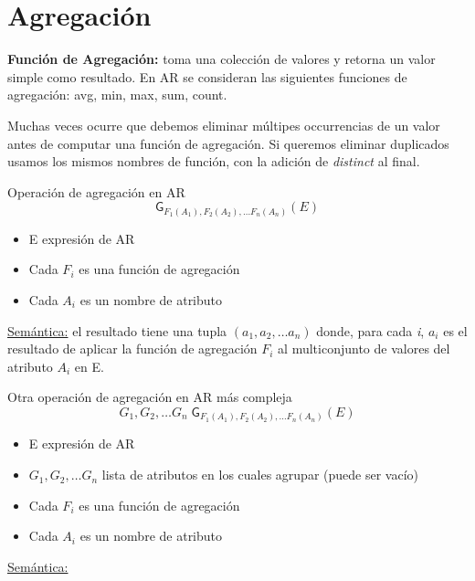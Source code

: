 \documentclass[12pt,a4paper]{report}
\begin{document}
	\section{Agregación}
		\par \textbf{Función de Agregación:} toma una colección de valores y retorna un valor simple como resultado. En AR se consideran las siguientes funciones de agregación: avg, min, max, sum, count.
		\par Muchas veces ocurre que debemos eliminar múltipes occurrencias de un valor antes de computar una función de agregación. Si queremos eliminar duplicados usamos los mismos nombres de función, con la adición de \textit{distinct} al final.
		\vspace{5mm}		
		\par Operación de agregación en AR
		\[\mathsf{G}_{F_{1}(A_{1}), F_{2}(A_{2}), \dotsc F_{n}(A_{n})}(E)\]
		\begin{itemize}
			\item E expresión de AR
			\item Cada $F_{i}$ es una función de agregación
			\item Cada $A_{i}$ es un nombre de atributo
		\end{itemize}
		\par \underline{Semántica:} el resultado tiene una tupla $(a_{1}, a_{2}, \dotsc a_{n})$ donde, para cada \textit{i}, $a_{i}$ es el resultado de aplicar la función de agregación $F_{i}$ al multiconjunto de valores del atributo $A_{i}$ en E.
		\vspace{5mm}	
		\par Otra operación de agregación en AR más compleja
		\[ G_{1}, G_{2}, \dotsc G_{n} \; \mathsf{G}_{F_{1}(A_{1}), F_{2}(A_{2}), \dotsc F_{n}(A_{n})}(E)\]
		\begin{itemize}
			\item E expresión de AR
			\item $G_{1}, G_{2}, \dotsc G_{n}$ lista de atributos en los cuales agrupar (puede ser vacío)
			\item Cada $F_{i}$ es una función de agregación
			\item Cada $A_{i}$ es un nombre de atributo
		\end{itemize}
		\par \underline{Semántica:}
\end{document}
